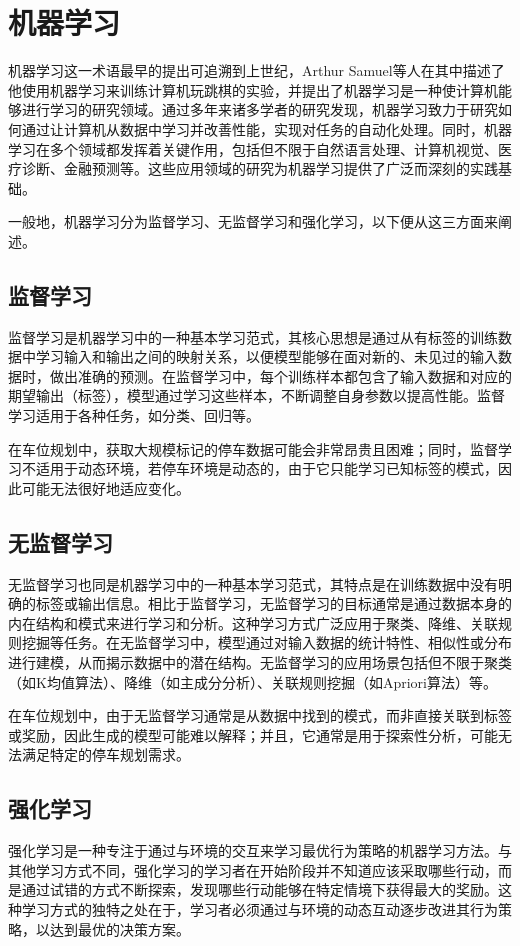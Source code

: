 \section{机器学习}
机器学习这一术语最早的提出可追溯到上世纪，Arthur Samuel\cite{samuel2000some}等人在其中描述了他使用机器学习来训练计算机玩跳棋的实验，并提出了机器学习是一种使计算机能够进行学习的研究领域。通过多年来诸多学者的研究发现，机器学习致力于研究如何通过让计算机从数据中学习并改善性能，实现对任务的自动化处理。同时，机器学习在多个领域都发挥着关键作用，包括但不限于自然语言处理\cite{young2018recent}、计算机视觉\cite{lecun2015deep}、医疗诊断\cite{esteva2017dermatologist}、金融预测\cite{tsantekidis2017forecasting}等。这些应用领域的研究为机器学习提供了广泛而深刻的实践基础。

一般地，机器学习分为监督学习、无监督学习和强化学习\cite{jordan2015machine}，以下便从这三方面来阐述。
\subsection{监督学习}
监督学习是机器学习中的一种基本学习范式，其核心思想是通过从有标签的训练数据中学习输入和输出之间的映射关系，以便模型能够在面对新的、未见过的输入数据时，做出准确的预测。在监督学习中，每个训练样本都包含了输入数据和对应的期望输出（标签），模型通过学习这些样本，不断调整自身参数以提高性能。监督学习适用于各种任务，如分类、回归等。

在车位规划中，获取大规模标记的停车数据可能会非常昂贵且困难；同时，监督学习不适用于动态环境，若停车环境是动态的，由于它只能学习已知标签的模式，因此可能无法很好地适应变化。
\subsection{无监督学习}
无监督学习也同是机器学习中的一种基本学习范式，其特点是在训练数据中没有明确的标签或输出信息。相比于监督学习，无监督学习的目标通常是通过数据本身的内在结构和模式来进行学习和分析。这种学习方式广泛应用于聚类、降维、关联规则挖掘等任务。在无监督学习中，模型通过对输入数据的统计特性、相似性或分布进行建模，从而揭示数据中的潜在结构。无监督学习的应用场景包括但不限于聚类（如K均值算法）、降维（如主成分分析）、关联规则挖掘（如Apriori算法）等。

在车位规划中，由于无监督学习通常是从数据中找到的模式，而非直接关联到标签或奖励，因此生成的模型可能难以解释；并且，它通常是用于探索性分析，可能无法满足特定的停车规划需求。
\subsection{强化学习}
强化学习是一种专注于通过与环境的交互来学习最优行为策略的机器学习方法。与其他学习方式不同，强化学习的学习者在开始阶段并不知道应该采取哪些行动，而是通过试错的方式不断探索，发现哪些行动能够在特定情境下获得最大的奖励。这种学习方式的独特之处在于，学习者必须通过与环境的动态互动逐步改进其行为策略，以达到最优的决策方案。\cite{sutton2018reinforcement}

